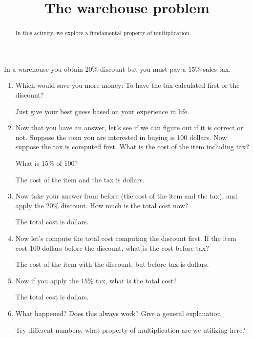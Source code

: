 \documentclass{ximera}
\title{The warehouse problem}
\begin{document}
\begin{abstract}
In this activity, we explore a fundamental property of multiplication. 
\end{abstract}
\maketitle

\begin{question}
In a warehouse you obtain $20\%$ discount but you must pay a $15\%$
sales tax. 

\begin{enumerate}
\item Which would save you more money: To have the tax calculated
  first or the discount?
\begin{solution}
\begin{free-response}
Just give your best guess based on your experience in life. 
\end{free-response}
\end{solution}
\item Now that you have an answer, let's see if we can figure out if
  it is correct or not. Suppose the item you are interested in buying
  is 100 dollars. Now suppose the tax is computed first. What is the
  cost of the item including tax?
\begin{solution}
\begin{hint}
What is $15\%$ of $100$?  
\end{hint}
The cost of the item and the tax is
 dollars. 
\end{solution}
\item Now take your answer from before (the cost of the item and the tax),
and apply the $20\%$ discount. How much is the total cost now?
\begin{solution}
The total cost is  dollars. 
\end{solution}
\item Now let's compute the total cost computing the discount first. If the
item cost $100$ dollars before the discount, what is the cost before tax?
\begin{solution}
The cost of the item with the discount, but before tax is  dollars. 
\end{solution}
\item Now if you apply the $15\%$ tax, what is the total cost?
\begin{solution}
The total cost is  dollars.
\end{solution} 
\item What happened? Does this always work? Give a general explanation.
\begin{solution}
\begin{free-response}
Try different numbers, what property of multiplication are we
utilizing here?
\end{free-response}
\end{solution}
\end{enumerate}
\end{question}
\end{document}
